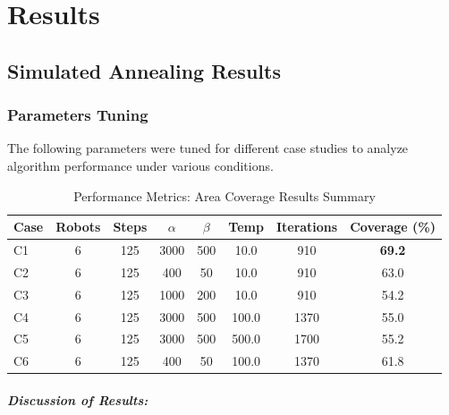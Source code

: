 \chapter{Results}\label{chap:results}

\section{Simulated Annealing Results}

\subsection{Parameters Tuning}

The following parameters were tuned for different case studies to analyze algorithm performance under various conditions.

\begin{table}[H]
\centering
\caption{Performance Metrics: Area Coverage Results Summary}
\begin{tabular}{@{}lccccccc@{}}
\toprule
\textbf{Case} & \textbf{Robots} & \textbf{Steps} & \textbf{$\alpha$} & \textbf{$\beta$} & \textbf{Temp} & \textbf{Iterations} & \textbf{Coverage (\%)} \\
\midrule
C1 & 6 & 125 & 3000 & 500 & 10.0 & 910 & \textbf{69.2} \\
C2 & 6 & 125 & 400 & 50 & 10.0 & 910 & 63.0 \\
C3 & 6 & 125 & 1000 & 200 & 10.0 & 910 & 54.2 \\
C4 & 6 & 125 & 3000 & 500 & 100.0 & 1370 & 55.0 \\
C5 & 6 & 125 & 3000 & 500 & 500.0 & 1700 & 55.2 \\
C6 & 6 & 125 & 400 & 50 & 100.0 & 1370 & 61.8 \\
\bottomrule
\end{tabular}
\label{tab:sa_results}
\end{table}

\paragraph{Discussion of Results:}

